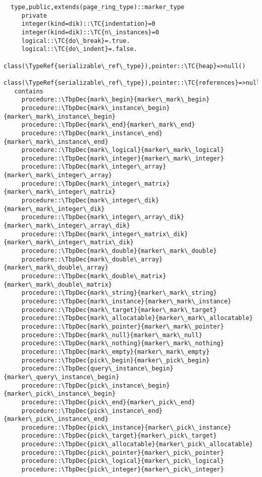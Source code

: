 \begin{Verbatim}
  type,public,extends(page_ring_type)::marker_type
     private
     integer(kind=dik)::\TC{indentation}=0
     integer(kind=dik)::\TC{n\_instances}=0
     logical::\TC{do\_break}=.true.
     logical::\TC{do\_indent}=.false.
     class(\TypeRef{serializable\_ref\_type}),pointer::\TC{heap}=>null()
     class(\TypeRef{serializable\_ref\_type}),pointer::\TC{references}=>null()
   contains
     procedure::\TbpDec{mark\_begin}{marker\_mark\_begin}
     procedure::\TbpDec{mark\_instance\_begin}{marker\_mark\_instance\_begin}
     procedure::\TbpDec{mark\_end}{marker\_mark\_end}
     procedure::\TbpDec{mark\_instance\_end}{marker\_mark\_instance\_end}
     procedure::\TbpDec{mark\_logical}{marker\_mark\_logical}
     procedure::\TbpDec{mark\_integer}{marker\_mark\_integer}
     procedure::\TbpDec{mark\_integer\_array}{marker\_mark\_integer\_array}
     procedure::\TbpDec{mark\_integer\_matrix}{marker\_mark\_integer\_matrix}
     procedure::\TbpDec{mark\_integer\_dik}{marker\_mark\_integer\_dik}
     procedure::\TbpDec{mark\_integer\_array\_dik}{marker\_mark\_integer\_array\_dik}
     procedure::\TbpDec{mark\_integer\_matrix\_dik}{marker\_mark\_integer\_matrix\_dik}
     procedure::\TbpDec{mark\_double}{marker\_mark\_double}
     procedure::\TbpDec{mark\_double\_array}{marker\_mark\_double\_array}
     procedure::\TbpDec{mark\_double\_matrix}{marker\_mark\_double\_matrix}
     procedure::\TbpDec{mark\_string}{marker\_mark\_string}
     procedure::\TbpDec{mark\_instance}{marker\_mark\_instance}
     procedure::\TbpDec{mark\_target}{marker\_mark\_target}
     procedure::\TbpDec{mark\_allocatable}{marker\_mark\_allocatable}
     procedure::\TbpDec{mark\_pointer}{marker\_mark\_pointer}
     procedure::\TbpDec{mark\_null}{marker\_mark\_null}
     procedure::\TbpDec{mark\_nothing}{marker\_mark\_nothing}
     procedure::\TbpDec{mark\_empty}{marker\_mark\_empty}
     procedure::\TbpDec{pick\_begin}{marker\_pick\_begin}
     procedure::\TbpDec{query\_instance\_begin}{marker\_query\_instance\_begin}
     procedure::\TbpDec{pick\_instance\_begin}{marker\_pick\_instance\_begin}
     procedure::\TbpDec{pick\_end}{marker\_pick\_end}
     procedure::\TbpDec{pick\_instance\_end}{marker\_pick\_instance\_end}
     procedure::\TbpDec{pick\_instance}{marker\_pick\_instance}
     procedure::\TbpDec{pick\_target}{marker\_pick\_target}
     procedure::\TbpDec{pick\_allocatable}{marker\_pick\_allocatable}
     procedure::\TbpDec{pick\_pointer}{marker\_pick\_pointer}
     procedure::\TbpDec{pick\_logical}{marker\_pick\_logical}
     procedure::\TbpDec{pick\_integer}{marker\_pick\_integer}

\end{Verbatim}
